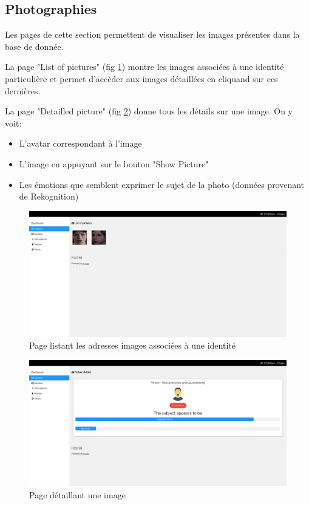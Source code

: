 \subsection{Photographies}
Les pages de cette section permettent de visualiser les images présentes dans la base de donnée.

La page "List of pictures" (fig \ref{fig:dashboard_list_pictures}) montre les images associées à une identité particulière et 
permet d'accèder aux images détaillées en cliquand sur ces dernières.

La page "Detailled picture" (fig \ref{fig:dashboard_picture}) donne tous les détails sur une image. On y voit:
\begin{itemize}
    \item L'avatar correspondant à l'image
    \item L'image en appuyant sur le bouton "Show Picture"
    \item Les émotions que semblent exprimer le sujet de la photo (données provenant de Rekognition)
\end{itemize}

\clearpage
\newpage
\thispagestyle{empty}
\begin{landscape}
    \centering
\thispagestyle{empty}
\begin{figure}[H]
	\includegraphics[width=0.95\linewidth]{images/dashboard/pictures.png}
	\caption{Page listant les adresses images associées à une identité}
	\label{fig:dashboard_list_pictures}
\end{figure}
\end{landscape}

\clearpage
\newpage
\thispagestyle{empty}
\begin{landscape}
    \centering
\thispagestyle{empty}
\begin{figure}[H]
	\includegraphics[width=0.95\linewidth]{images/dashboard/detailled_pictures.png}
	\caption{Page détaillant une image}
	\label{fig:dashboard_picture}
\end{figure}
\end{landscape}


